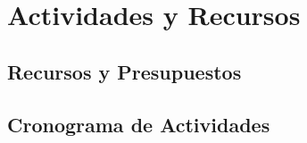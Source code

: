 \chapter{Actividades y Recursos} \label{actividades}
	\section{Recursos y Presupuestos} \label{sec:recypre}
	\section{Cronograma de Actividades} \label{sec:crono}
	